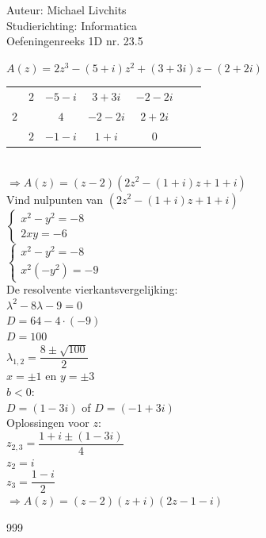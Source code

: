 \documentclass[a4paper]{article}
\begin{document}
  
\noindent \large Auteur: Michael Livchits \\
\noindent \large Studierichting: Informatica\\
\noindent \large Oefeningenreeks 1D nr. 23.5\\

\medskip

\normalsize

$A(z) = 2z^3-(5+i)z^2+(3+3i)z-(2+2i)$\\

\begin{tabular}{c|cccccc}
	& $2$ 	& $-5-i$ 	& $3+3i$ 	& $-2-2i$ 	 	\\
$2$ 	& 		& $4$ 	& $-2-2i$ 	& $2+2i$  			\\ \hline
	& $2$   & $-1-i$ 	& $1+i$ 	& \multicolumn{1}{|c}{$0$}  \\
\end{tabular}\\

$\Rightarrow A(z) = (z-2)(2z^2-(1+i)z+1+i)$ \\

Vind nulpunten van $(2z^2-(1+i)z+1+i)$ \\

$\left\{
\begin{array}{l}
	x^2-y^2 = -8 \\
	2xy = -6
\end{array}
\right .$\\

$\left\{
\begin{array}{l}
	x^2 - y^2 = -8 \\
	x^2 (-y^2) = -9
\end{array}
\right .$\\

De resolvente vierkantsvergelijking: \\

$\lambda^2 - 8\lambda -9 = 0 $\\

$D = 64 - 4\cdot(-9)$\\

$D = 100$\\

$\lambda_{1,2} = \dfrac{8\pm\sqrt{100}}{2} $\\

$x = \pm1$ en $y = \pm3$\\

$ b < 0 $:\\

$D = \left(1 - 3i\right) $ of $D = \left(-1 + 3i\right) $ \\

Oplossingen voor $z$: \\

$z_{2,3} = \dfrac{1+i\pm(1-3i)}{4}$\\

$z_{2} = i$\\

$z_{3} = \dfrac{1-i}{2}$\\

$\Rightarrow A(z) = (z-2)(z+i)(2z-1-i)$ \\


\begin{thebibliography}{999}

\end{thebibliography}
\end{document}
